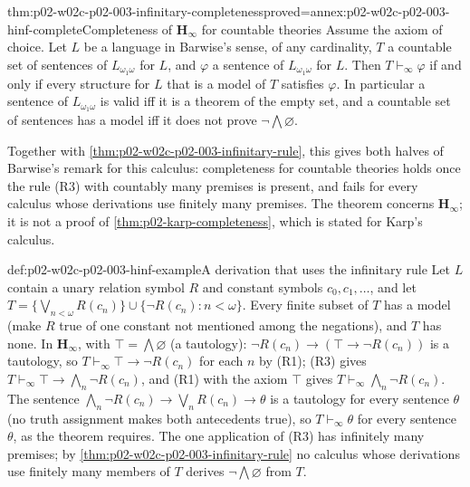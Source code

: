 \begin{hbtheorem}{thm:p02-w02c-p02-003-infinitary-completeness}{proved=annex:p02-w02c-p02-003-hinf-complete}{Completeness of \(\mathbf H_{\infty}\) for countable theories}
Assume the axiom of choice.  Let \(L\) be a language in Barwise's sense,
of any cardinality, \(T\) a countable set of sentences of
\(L_{\omega_1\omega}\) for \(L\), and \(\varphi\) a sentence of
\(L_{\omega_1\omega}\) for \(L\).  Then \(T\vdash_{\infty}\varphi\) if and
only if every structure for \(L\) that is a model of \(T\) satisfies
\(\varphi\).  In particular a sentence of \(L_{\omega_1\omega}\) is valid
iff it is a theorem of the empty set, and a countable set of sentences has
a model iff it does not prove \(\neg\bigwedge\varnothing\).
\end{hbtheorem}

Together with \cref{thm:p02-w02c-p02-003-infinitary-rule}, this gives
both halves of Barwise's remark for this calculus: completeness for
countable theories holds once the rule (R3) with countably many premises
is present, and fails for every calculus whose derivations use finitely
many premises.  The theorem concerns \(\mathbf H_{\infty}\); it is not a
proof of \cref{thm:p02-karp-completeness}, which is stated for Karp's
calculus.

\begin{hbexample}{def:p02-w02c-p02-003-hinf-example}{A derivation that uses the infinitary rule}
Let \(L\) contain a unary relation symbol \(R\) and constant symbols
\(c_0,c_1,\ldots\), and let
\(T=\{\bigvee_{n<\omega}R(c_n)\}\cup\{\neg R(c_n):n<\omega\}\).  Every
finite subset of \(T\) has a model (make \(R\) true of one constant not
mentioned among the negations), and \(T\) has none.  In
\(\mathbf H_{\infty}\), with \(\top=\bigwedge\varnothing\) (a tautology):
\(\neg R(c_n)\to(\top\to\neg R(c_n))\) is a tautology, so
\(T\vdash_{\infty}\top\to\neg R(c_n)\) for each \(n\) by (R1); (R3) gives
\(T\vdash_{\infty}\top\to\bigwedge_{n}\neg R(c_n)\), and (R1) with the axiom
\(\top\) gives \(T\vdash_{\infty}\bigwedge_n\neg R(c_n)\).  The sentence
\(\bigwedge_n\neg R(c_n)\to\bigvee_n R(c_n)\to\theta\) is a tautology for
every sentence \(\theta\) (no truth assignment makes both antecedents true),
so \(T\vdash_{\infty}\theta\) for every sentence \(\theta\), as the theorem
requires.  The one application of (R3) has infinitely many premises; by
\cref{thm:p02-w02c-p02-003-infinitary-rule} no calculus whose derivations
use finitely many members of \(T\) derives \(\neg\bigwedge\varnothing\)
from \(T\).
\end{hbexample}

